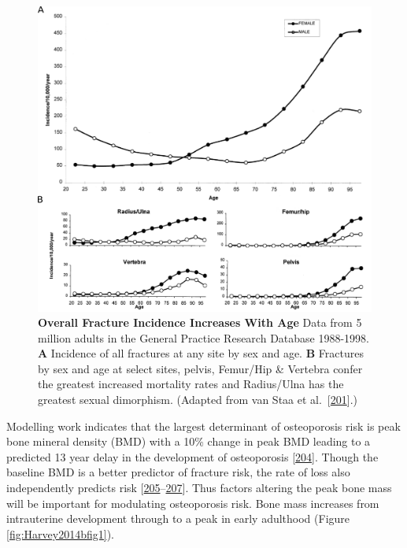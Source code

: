 \documentclass[
]{book}
\begin{document}
\begin{figure}

{\centering \includegraphics[width=0.8\linewidth]{figs/adapted_from_VanStaa2001_Fig1-2} 

}

\caption{\textbf{Overall Fracture Incidence Increases With Age} Data from 5 million adults in the General Practice Research Database 1988-1998. \textbf{A} Incidence of all fractures at any site by sex and age. \textbf{B} Fractures by sex and age at select sites, pelvis, Femur/Hip \& Vertebra confer the greatest increased mortality rates and Radius/Ulna has the greatest sexual dimorphism. (Adapted from van Staa et al.~{[}\protect\hyperlink{ref-VanStaa2001}{201}{]}.)}\label{fig:VanStaa2001}
\end{figure}



Modelling work indicates that the largest determinant of osteoporosis risk is peak bone mineral density (BMD) with a 10\% change in peak BMD leading to a predicted 13 year delay in the development of osteoporosis {[}\protect\hyperlink{ref-Hernandez2003}{204}{]}.
Though the baseline BMD is a better predictor of fracture risk, the rate of loss also independently predicts risk {[}\protect\hyperlink{ref-Nguyen2005}{205}--\protect\hyperlink{ref-Hui1990}{207}{]}.
Thus factors altering the peak bone mass will be important for modulating osteoporosis risk.
Bone mass increases from intrauterine development through to a peak in early adulthood (Figure \ref{fig:Harvey2014bfig1}).
\end{document}
